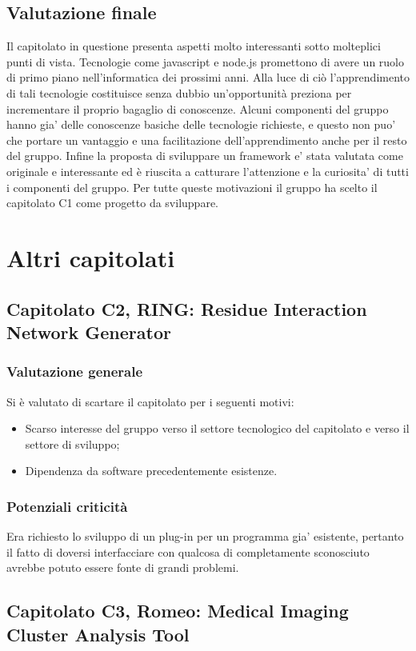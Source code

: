 \subsection{Valutazione finale} 
\label{2.5}
Il capitolato in questione presenta aspetti molto interessanti sotto molteplici punti di vista. Tecnologie come javascript e node.js promettono di avere un ruolo di primo piano nell’informatica dei prossimi anni. Alla luce di ciò l’apprendimento di tali tecnologie costituisce senza dubbio un’opportunità preziona per incrementare il proprio bagaglio di conoscenze. Alcuni componenti del gruppo hanno gia’ delle conoscenze basiche delle tecnologie richieste, e questo non puo’ che portare un vantaggio e una facilitazione dell’apprendimento anche per il resto del gruppo. Infine la proposta di sviluppare un framework e’ stata valutata come originale e interessante ed è riuscita a catturare l’attenzione e la curiosita’ di tutti i componenti del gruppo. Per tutte queste motivazioni il gruppo ha scelto il capitolato C1 come progetto da sviluppare.

\newpage
\section{Altri capitolati}%
\label{3}
\subsection{Capitolato C2, RING: Residue Interaction Network Generator} 
\label{3.1}
\subsubsection{Valutazione generale} 
Si è valutato di scartare il capitolato per i seguenti motivi:
\begin{itemize}
\item Scarso interesse del gruppo verso il settore tecnologico del capitolato e verso il settore di sviluppo;
\item Dipendenza da software precedentemente esistenze.
\end{itemize}
\subsubsection{Potenziali criticità} 
Era richiesto lo sviluppo di un plug-in per un programma gia’ esistente, pertanto il fatto di doversi interfacciare con qualcosa di completamente sconosciuto avrebbe potuto essere fonte di grandi problemi.
\subsection{Capitolato C3,  Romeo: Medical Imaging Cluster Analysis Tool} 
\label{3.2}
